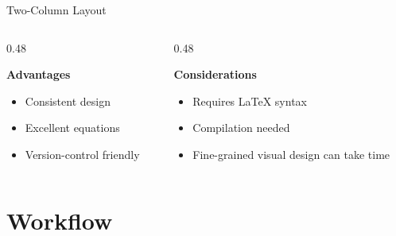 \documentclass[aspectratio=169,11pt]{beamer}
\begin{document}
\begin{frame}{Two-Column Layout}

    \begin{columns}[T]

        \begin{column}{0.48\textwidth}

            \textbf{Advantages}

            \begin{itemize}
                \item Consistent design
                \item Excellent equations
                \item Version-control friendly
            \end{itemize}

        \end{column}

        \begin{column}{0.48\textwidth}

            \textbf{Considerations}

            \begin{itemize}
                \item Requires LaTeX syntax
                \item Compilation needed
                \item Fine-grained visual
                      design can take time
            \end{itemize}

        \end{column}

    \end{columns}

\end{frame}

\section{Workflow}
\end{document}
